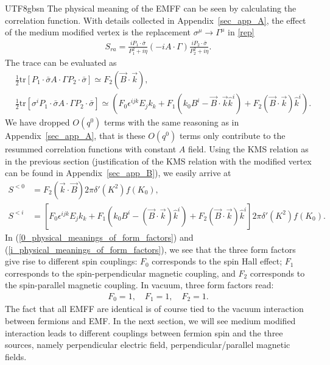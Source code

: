 \documentclass[11pt]{article}\def\baselinestretch{1.4}
\def\e{{\epsilon}}
\def\G{{\Gamma}}
\def\h{\eta}
\def\m{{\mu}}
\def\s{{\sigma}}
\def\({\left(}
\def\){\right)}
\newcommand{\tr}{\text{tr}}
\begin{document}
\begin{CJK}{UTF8}{gbsn}
The physical meaning of the EMFF can be seen by calculating the correlation function. With details collected in Appendix~\ref{sec_app_A}, the effect of the medium modified vertex is the replacement $\s^\m\to\G^\m$ in \eqref{rep}
\begin{align}
S_{ra}=\frac{iP_1\cdot\bar{\s}}{P_1^2+i\h}(-i A\cdot\G)\frac{iP_2\cdot\bar{\s}}{P_2^2+i\h}.
\end{align}
The trace can be evaluated as
\begin{align}
&\frac{1}{2}\tr[P_1\cdot\bar{\s}A\cdot\G P_2\cdot\bar{\s}]\simeq F_2(\vec{B}\cdot\vec{k}),\\ &\frac{1}{2}\tr[\s^i P_1\cdot\bar{\s}A\cdot\G P _2\cdot\bar{\s}]\simeq \(F_0\e^{ijk}E_jk_k+F_1(k_0B^i-\vec{B}\cdot \vec{k}\hat{k}^i)+F_2(\vec{B}\cdot\vec{k})\hat{k}^i\).
\end{align}
We have dropped $O(q^0)$ terms with the same reasoning as in Appendix~\ref{sec_app_A}, that is these $O(q^0)$ terms only contribute to the resummed correlation functions with constant $A$ field. Using the KMS relation as in the previous section (justification of the KMS relation with the modified vertex can be found in Appendix~\ref{sec_app_B}), we easily arrive at
\begin{align}
S^{<0 } &= F_2 \left(\vec{k} \cdot \vec{B}\right) 2\pi \delta '(K^2) f(K_0) ,\label{0_physical_meanings_of_form_factors}\\
S^{<i } &= \left[F_0 \epsilon^{ijk}E_j k_k + F_1 \left( k_0 B^i - \left(\vec{B} \cdot \vec{k}\right)\hat{k}^i\right) + F_2 \left(\vec{B} \cdot \vec{k}\right)\hat{k}^i\right] 2\pi \delta '(K^2) f(K_0). \label{i_physical_meanings_of_form_factors}
\end{align}
In (\ref{0_physical_meanings_of_form_factors}) and (\ref{i_physical_meanings_of_form_factors}), we see that the three form factors give rise to different spin couplings: $F_0$ corresponds to the spin Hall effect; $F_1$ corresponds to the spin-perpendicular magnetic coupling, and $F_2$ corresponds to the spin-parallel magnetic coupling. In vacuum, three form factors read:
%
\begin{align}\label{vac_EMFF}
F_0=1, \quad F_1=1, \quad F_2=1.
\end{align}
%
The fact that all EMFF are identical is of course tied to the vacuum interaction between fermions and EMF. In the next section, we will see medium modified interaction leads to different couplings between fermion spin and the three sources, namely perpendicular electric field, perpendicular/parallel magnetic fields.


\end{CJK}
\end{document}
